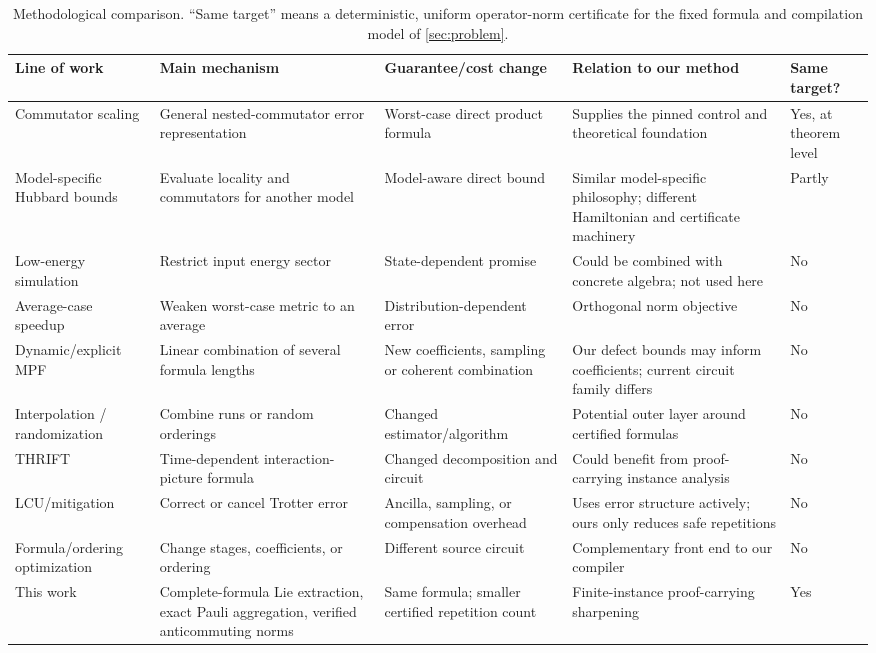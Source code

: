 \begin{table}[p]
\centering
\small
\caption{Methodological comparison.  ``Same target'' means a deterministic,
uniform operator-norm certificate for the fixed formula and compilation model
of \cref{sec:problem}.}
\label{tab:literature-map}
\begin{tabularx}{\textwidth}{@{}p{}p{}p{}p{}X@{}}
\toprule
Line of work & Main mechanism & Guarantee/cost change & Relation to our method &
Same target? \\
\midrule
Commutator scaling \citep{childs2021trotter} & General nested-commutator error
representation & Worst-case direct product formula & Supplies the pinned
control and theoretical foundation & Yes, at theorem level \\
Model-specific Hubbard bounds \citep{schubert2023hubbard} & Evaluate locality
and commutators for another model & Model-aware direct bound & Similar
model-specific philosophy; different Hamiltonian and certificate machinery &
Partly \\
Low-energy simulation \citep{sahinoglu2021lowenergy} & Restrict input energy
sector & State-dependent promise & Could be combined with concrete algebra;
not used here & No \\
Average-case speedup \citep{chen2024average} & Weaken worst-case metric to an
average & Distribution-dependent error & Orthogonal norm objective & No \\
Dynamic/explicit MPF \citep{zhuk2024dynamic,aftab2024mpf,mizuta2026mpf} &
Linear combination of several formula lengths & New coefficients, sampling or
coherent combination & Our defect bounds may inform coefficients; current
circuit family differs & No \\
Interpolation / randomization \citep{rendon2024chebyshev,cho2024doubling} &
Combine runs or random orderings & Changed estimator/algorithm & Potential
outer layer around certified formulas & No \\
THRIFT \citep{bosse2025thrift} & Time-dependent interaction-picture formula &
Changed decomposition and circuit & Could benefit from proof-carrying
instance analysis & No \\
LCU/mitigation \citep{zeng2025lcu,watson2025mitigation,wang2026hncc} & Correct
or cancel Trotter error & Ancilla, sampling, or compensation overhead & Uses
error structure actively; ours only reduces safe repetitions & No \\
Formula/ordering optimization \citep{malezic2026schemes,tate2026ordering} &
Change stages, coefficients, or ordering & Different source circuit &
Complementary front end to our compiler & No \\
This work & Complete-formula Lie extraction, exact Pauli aggregation, verified
anticommuting norms & Same formula; smaller certified repetition count &
Finite-instance proof-carrying sharpening & Yes \\
\bottomrule
\end{tabularx}
\end{table}

